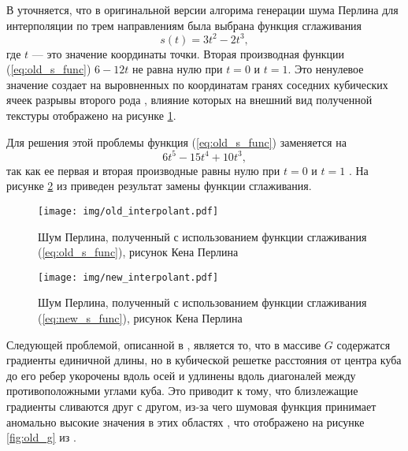 
В \cite{impperlin} уточняется, что в оригинальной версии алгорима генерации шума Перлина для интерполяции по трем направлениям была выбрана функция сглаживания
\begin{equation}
	\label{eq:old_s_func}
	s(t) = 3t^2 - 2t^3,
\end{equation}
где $t$ --- это значение координаты точки. Вторая производная функции (\ref{eq:old_s_func}) $6 - 12t$ не равна нулю при $t = 0$ и $t = 1$. Это ненулевое значение создает на выровненных по координатам гранях соседних кубических ячеек разрывы второго рода  \cite{impperlin}, влияние которых на внешний вид полученной текстуры отображено на рисунке \ref{fig:old_interpolant}.

Для решения этой проблемы функция (\ref{eq:old_s_func}) заменяется на
\begin{equation}
	\label{eq:new_s_func}
	6t^5 - 15t^4 + 10t^3,
\end{equation}
так как ее первая и вторая производные равны нулю при $t = 0$ и $t = 1$ \cite{impperlin}. На рисунке \ref{fig:new_interpolant} из \cite{impperlin} приведен результат замены функции сглаживания.

\clearpage
\begin{figure}[h]
	\centering
	\texttt{[image: img/old\_interpolant.pdf]}
	\caption{Шум Перлина, полученный с использованием функции сглаживания (\ref{eq:old_s_func}), рисунок Кена Перлина \cite{impperlin}}
	\label{fig:old_interpolant}
\end{figure}

\begin{figure}[h]
	\centering
	\texttt{[image: img/new\_interpolant.pdf]}
	\caption{Шум Перлина, полученный с использованием функции сглаживания (\ref{eq:new_s_func}), рисунок Кена Перлина \cite{impperlin}}
	\label{fig:new_interpolant}
\end{figure}
\clearpage

Следующей проблемой, описанной в \cite{impperlin}, является то, что в массиве $G$ содержатся градиенты единичной длины, но в кубической решетке расстояния от центра куба до его ребер укорочены вдоль осей и удлинены вдоль диагоналей между противоположными углами куба. Это приводит к тому, что близлежащие градиенты сливаются друг с другом, из-за чего шумовая функция принимает аномально высокие значения в этих областях \cite{impperlin}, что отображено на рисунке \ref{fig:old_g} из \cite{impperlin}. 

